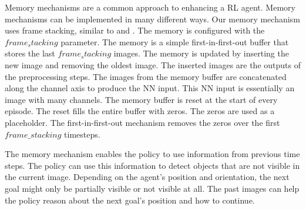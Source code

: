 Memory mechanisms are a common approach to enhancing a \ac{RL} agent. Memory mechanisms can be implemented in many different ways. Our memory mechanism uses frame stacking, similar to \textcite{maximilian} and \textcite{atari}. The memory is configured with the $frame_stacking$ parameter. The memory is a simple first-in-first-out buffer that stores the last $frame_stacking$ images. The memory is updated by inserting the new image and removing the oldest image. The inserted images are the outputs of the preprocessing steps.
The images from the memory buffer are concatenated along the channel axis to produce the \ac{NN} input. This \ac{NN} input is essentially an image with many channels.
The memory buffer is reset at the start of every episode. The reset fills the entire buffer with zeros. The zeros are used as a placeholder. The first-in-first-out mechanism removes the zeros over the first $frame\_stacking$ timesteps.

The memory mechanism enables the policy to use information from previous time steps. The policy can use this information to detect objects that are not visible in the current image. Depending on the agent's position and orientation, the next goal might only be partially visible or not visible at all. The past images can help the policy reason about the next goal's position and how to continue.



\newcommand{\includePreprocessedImage}[1]{\texttt{[image: Bilder/image\_printer\_images/memory\_mechanism/preprocessed\_image\_step\_\#1.png]}}
\newcommand\timestepT{5}
\newcommand\timestepTminusOne{4}
\newcommand\timestepTminusTwo{3}
\newcommand\timestepTminusThree{2}
\newcommand\timestepTminusFour{1}
\newcommand\imagesOffsetY{0}
\newcommand\inOutImageHeight{0.75}
\newcommand\bufferXOffset{-2}
\newcommand\bufferWidth{7}


\usetikzlibrary{fit}

